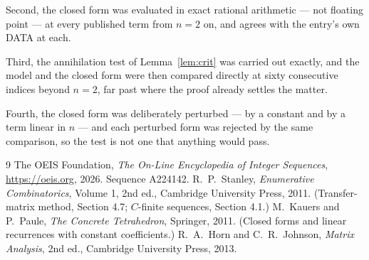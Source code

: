 \documentclass[11pt,a4paper]{article}
\theoremstyle{plain}
\theoremstyle{definition}
\begin{document}
Second, the closed form was evaluated in exact rational arithmetic --- not floating point ---
at every published term from $n=2$ on, and agrees with the entry's own DATA at each.

Third, the annihilation test of Lemma~\ref{lem:crit} was carried out exactly, and the model
and the closed form were then compared directly at sixty consecutive indices beyond
$n=2$, far past where the proof already settles the matter.

Fourth, the closed form was deliberately perturbed --- by a constant and by a term linear in
$n$ --- and each perturbed form was rejected by the same comparison, so the test is not one
that anything would pass.

\begin{thebibliography}{9}
 The OEIS Foundation, \emph{The On-Line Encyclopedia of Integer
Sequences}, \url{https://oeis.org}, 2026. Sequence A224142.
 R.~P.~Stanley, \emph{Enumerative Combinatorics}, Volume 1, 2nd ed.,
Cambridge University Press, 2011. (Transfer-matrix method, Section 4.7; $C$-finite sequences,
Section 4.1.)
 M.~Kauers and P.~Paule, \emph{The Concrete Tetrahedron}, Springer, 2011.
(Closed forms and linear recurrences with constant coefficients.)
 R.~A.~Horn and C.~R.~Johnson, \emph{Matrix Analysis}, 2nd ed., Cambridge
University Press, 2013.
\end{thebibliography}
\end{document}
